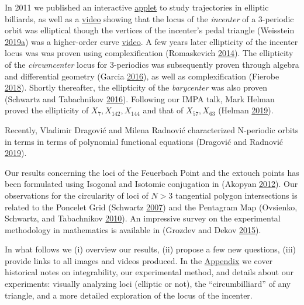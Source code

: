 \documentclass[]{article}
\begin{document}
In 2011 we published an interactive \href{http://demonstrations.wolfram.com/DynamicBilliardsInEllipse/}{applet} to study trajectories in elliptic billiards, as well as a \href{https://youtu.be/BBsyM7RnswA}{video} showing that the locus of the \emph{incenter} of a 3-periodic orbit was elliptical though the vertices of the incenter's pedal triangle (Weisstein \protect\hyperlink{ref-mw}{2019}\protect\hyperlink{ref-mw}{a}) was a higher-order curve \href{https://youtu.be/9xU6T7hQMzs}{video}. A few years later ellipticity of the incenter locus was was proven using complexification (Romaskevich \protect\hyperlink{ref-olga14}{2014}). The ellipticity of the \emph{circumcenter} locus for 3-periodics was subsequently proven through algebra and differential geometry (Garcia \protect\hyperlink{ref-ronaldo16}{2016}), as well as complexification (Fierobe \protect\hyperlink{ref-corentin19}{2018}). Shortly thereafter, the ellipticity of the \emph{barycenter} was also proven (Schwartz and Tabachnikov \protect\hyperlink{ref-sergei2016}{2016}). Following our IMPA talk, Mark Helman proved the ellipticity of \(X_7,X_{142},X_{144}\) and that of \(X_{57},X_{63}\) (Helman \protect\hyperlink{ref-helman19}{2019}).

Recently, Vladimir Dragović and Milena Radnović characterized N-periodic orbits in terms in terms of polynomial functional equations (Dragović and Radnović \protect\hyperlink{ref-dragovic88}{2019}).

Our results concerning the loci of the Feuerbach Point and the extouch points has been formulated using Isogonal and Isotomic conjugation in (Akopyan \protect\hyperlink{ref-akopyan12}{2012}). Our observations for the circularity of loci of \(N>3\) tangential polygon intersections is related to the Poncelet Grid (Schwartz \protect\hyperlink{ref-schwartz07}{2007}) and the Pentagram Map (Ovsienko, Schwartz, and Tabachnikov \protect\hyperlink{ref-sergei10_pentagram}{2010}). An impressive survey on the experimental methodology in mathematics is available in (Grozdev and Dekov \protect\hyperlink{ref-dekov05}{2015}).

In what follows we (i) overview our results, (ii) propose a few new questions, (iii) provide links to all images and videos produced. In the \href{appendices.html}{Appendix} we cover historical notes on integrability, our experimental method, and details about our experiments: visually analyzing loci (elliptic or not), the ``circumbilliard'' of any triangle, and a more detailed exploration of the locus of the incenter.
\end{document}

